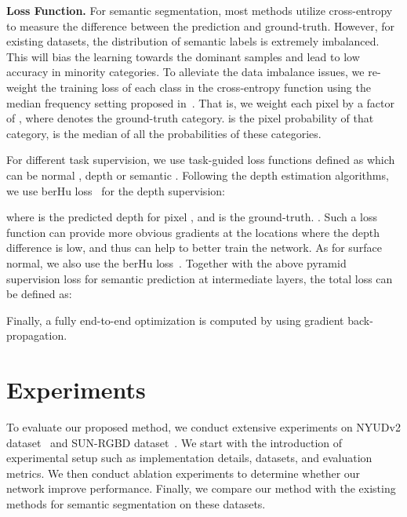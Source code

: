 \documentclass[10pt,twocolumn,letterpaper]{article}
\begin{document}
\noindent
\textbf{Loss Function.}
For semantic segmentation, most methods utilize cross-entropy to measure the difference between the prediction and ground-truth. However, for existing datasets, the distribution of semantic labels is extremely imbalanced. This will bias the learning towards the dominant samples and lead to low accuracy in minority categories. To alleviate the data imbalance issues, we re-weight the training loss of each class in the cross-entropy function using the median frequency setting proposed in~\cite{Eigen:ICCV15,Jiang:arXiv18}. That is, we weight each pixel by a factor of , where  denotes the ground-truth category.  is the pixel probability of that category,  is the median of all the probabilities of these categories.

For different task supervision, we use task-guided loss functions defined as  which can be normal , depth  or semantic . Following the depth estimation algorithms, we use berHu loss~\cite{Laina:3DV16} for the depth supervision:

where  is the predicted depth for pixel , and  is the ground-truth. . Such a loss function can provide more obvious gradients at the locations where the depth difference is low, and thus can help to better train the network. As for surface normal, we also use the berHu loss~\cite{Laina:3DV16}. Together with the above pyramid supervision loss  for semantic prediction at intermediate layers, the total loss  can be defined as:

Finally, a fully end-to-end optimization is computed by using gradient back-propagation.

\section{Experiments}\label{sec:Experiments}
To evaluate our proposed method, we conduct extensive experiments on NYUDv2 dataset~\cite{Silberman:ECCV12} and SUN-RGBD dataset~\cite{Song:CVPR15}. We start with the introduction of experimental setup such as implementation details, datasets, and evaluation metrics. We then conduct ablation experiments to determine whether our network improve performance. Finally, we compare our method with the existing methods for semantic segmentation on these datasets.
\end{document}
